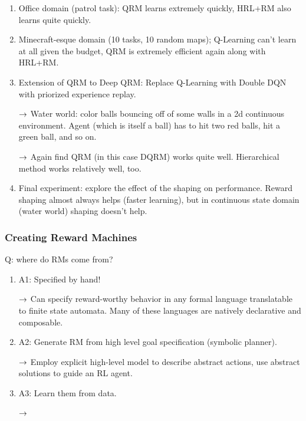 \begin{enumerate}
\item Office domain (patrol task): QRM learns extremely quickly, HRL+RM also learns quite quickly.
\item Minecraft-esque domain (10 tasks, 10 random maps); Q-Learning can't learn at all given the budget, QRM is extremely efficient again along with HRL+RM.
\item Extension of QRM to Deep QRM: Replace Q-Learning with Double DQN with priorized experience replay.

$\rightarrow$ Water world: color balls bouncing off of some walls in a 2d continuous environment. Agent (which is itself a ball) has to hit two red balls, hit a green ball, and so on.

$\rightarrow$ Again find QRM (in this case DQRM) works quite well. Hierarchical method works relatively well, too.

\item Final experiment: explore the effect of the shaping on performance. Reward shaping almost always helps (faster learning), but in continuous state domain (water world) shaping doesn't help.
\end{enumerate}


\subsubsection{Creating Reward Machines}
Q: where do RMs come from?
\begin{enumerate}
\item A1: Specified by hand!

$\rightarrow$ Can specify reward-worthy behavior in any formal language translatable to finite state automata. Many of these languages are natively declarative and composable.

\item A2: Generate RM from high level goal specification (symbolic planner).

$\rightarrow$ Employ explicit high-level model to describe abstract actions, use abstract solutions to guide an RL agent.

\item A3: Learn them from data.

$\rightarrow$ 

\end{enumerate}










